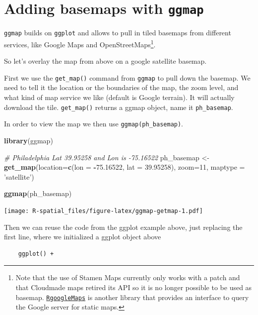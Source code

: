 \documentclass[]{book}
\newenvironment{Shaded}{\begin{snugshade}}{\end{snugshade}}
\newcommand{\KeywordTok}[1]{\textcolor[rgb]{0.13,0.29,0.53}{\textbf{#1}}}
\newcommand{\DataTypeTok}[1]{\textcolor[rgb]{0.13,0.29,0.53}{#1}}
\newcommand{\DecValTok}[1]{\textcolor[rgb]{0.00,0.00,0.81}{#1}}
\newcommand{\FloatTok}[1]{\textcolor[rgb]{0.00,0.00,0.81}{#1}}
\newcommand{\StringTok}[1]{\textcolor[rgb]{0.31,0.60,0.02}{#1}}
\newcommand{\CommentTok}[1]{\textcolor[rgb]{0.56,0.35,0.01}{\textit{#1}}}
\newcommand{\OperatorTok}[1]{\textcolor[rgb]{0.81,0.36,0.00}{\textbf{#1}}}
\newcommand{\NormalTok}[1]{#1}
\let\rmarkdownfootnote\footnote%
\def\footnote{\protect\rmarkdownfootnote}
\theoremstyle{definition}
\theoremstyle{definition}
\theoremstyle{definition}
\theoremstyle{remark}
\begin{document}
\section{\texorpdfstring{Adding basemaps with
\texttt{ggmap}}{Adding basemaps with ggmap}}\label{adding-basemaps-with-ggmap}

\texttt{ggmap} builds on \texttt{ggplot} and allows to pull in tiled
basemaps from different services, like Google Maps and
OpenStreetMaps\footnote{Note that the use of Stamen Maps currently only
  works with a patch and that Cloudmade maps retired its API so it is no
  longer possible to be used as basemap.
  \href{https://CRAN.R-project.org/package=RgoogleMaps}{\texttt{RgoogleMaps}}
  is another library that provides an interface to query the Google
  server for static maps.}.

So let's overlay the map from above on a google satellite basemap.

First we use the \texttt{get\_map()} command from \texttt{ggmap} to pull
down the basemap. We need to tell it the location or the boundaries of
the map, the zoom level, and what kind of map service we like (default
is Google terrain). It will actually download the tile.
\texttt{get\_map()} returns a ggmap object, name it
\texttt{ph\_basemap}.

In order to view the map we then use \texttt{ggmap(ph\_basemap)}.

\begin{Shaded}
\begin{Highlighting}[]
\KeywordTok{library}\NormalTok{(ggmap)}

\CommentTok{# Philadelphia Lat 39.95258 and Lon is -75.16522}
\NormalTok{ph_basemap <-}\StringTok{ }\KeywordTok{get_map}\NormalTok{(}\DataTypeTok{location=}\KeywordTok{c}\NormalTok{(}\DataTypeTok{lon =} \OperatorTok{-}\FloatTok{75.16522}\NormalTok{, }\DataTypeTok{lat =} \FloatTok{39.95258}\NormalTok{), }\DataTypeTok{zoom=}\DecValTok{11}\NormalTok{, }\DataTypeTok{maptype =} \StringTok{'satellite'}\NormalTok{)}

\KeywordTok{ggmap}\NormalTok{(ph_basemap)}
\end{Highlighting}
\end{Shaded}

\texttt{[image: R-spatial\_files/figure-latex/ggmap-getmap-1.pdf]}

Then we can reuse the code from the ggplot example above, just replacing
the first line, where we initialized a ggplot object above

\begin{verbatim}
    ggplot() + 
\end{verbatim}
\end{document}
